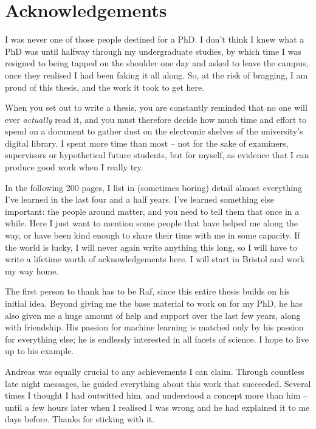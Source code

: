 \chapter*{Acknowledgements}

I was never one of those people destined for a PhD.
I don't think I knew what a PhD was until halfway through my undergraduate studies, 
    by which time I was resigned to being tapped on the shoulder one day and asked to leave the campus, 
    once they realised I had been faking it all along. 
So, at the risk of bragging, I am proud of this thesis, 
    and the work it took to get here. 
\par
When you set out to write a thesis, 
    you are constantly reminded that no one will ever \emph{actually} read it, 
    and you must therefore decide how much time and effort to spend on a document to 
    gather dust on the electronic shelves of the university's digital library. 
I spent more time than most -- 
    not for the sake of examiners, supervisors or hypothetical future students, 
    but for myself, as evidence that I can produce good work when I really try. 
\par 

In the following 200 pages, I list in (sometimes boring) detail almost everything I've learned 
    in the last four and a half years. 
I've learned something else important: 
    the people around matter, and you need to tell them that once in a while.
Here I just want to mention some people that have helped me along the way, 
    or have been kind enough to share their time with me in some capacity. 
If the world is lucky, I will never again write anything this long, 
    so I will have to write a lifetime worth of acknowledgements here. 
I will start in Bristol and work my way home. 

The first person to thank has to be Raf, since this entire thesis builds on his initial idea.
Beyond giving me the base material to work on for my PhD, 
    he has also given me a huge amount of help and support over the last few years, 
    along with friendship. 
His passion for machine learning is matched only by his passion for everything else; 
    he is endlessly interested in all facets of science. 
I hope to live up to his example. 
\par 

Andreas was equally crucial to any achievements I can claim. 
Through countless late night messages, he guided everything about this work that succeeded. 
Several times I thought I had outwitted him, and understood a concept more than him -- 
    until a few hours later when I realised I was wrong and he had explained it to me days before. 
Thanks for sticking with it. 
\par 

